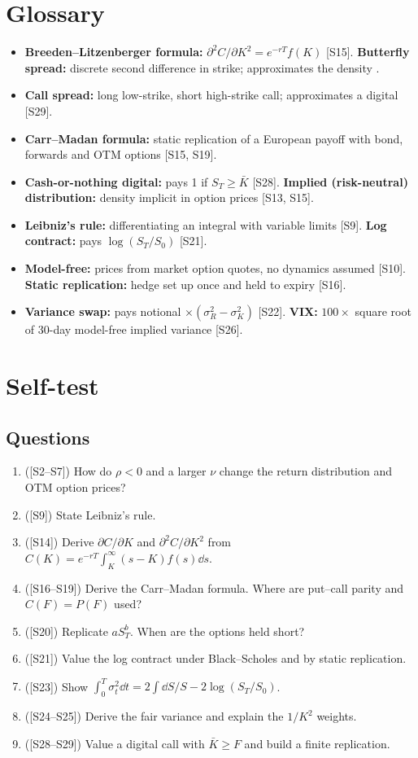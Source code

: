 \documentclass[10pt]{article}
\begin{document}
\section{Glossary}
\begin{itemize}
\item \textbf{Breeden--Litzenberger formula:} $\partial^2C/\partial K^2=e^{-rT}f(K)$ [S15]. \quad \textbf{Butterfly spread:} discrete second difference in strike; approximates the density \beyond.
\item \textbf{Call spread:} long low-strike, short high-strike call; approximates a digital [S29].
\item \textbf{Carr--Madan formula:} static replication of a European payoff with bond, forwards and OTM options [S15, S19].
\item \textbf{Cash-or-nothing digital:} pays 1 if $S_T\ge\bar K$ [S28]. \quad \textbf{Implied (risk-neutral) distribution:} density implicit in option prices [S13, S15].
\item \textbf{Leibniz's rule:} differentiating an integral with variable limits [S9]. \quad \textbf{Log contract:} pays $\log(S_T/S_0)$ [S21].
\item \textbf{Model-free:} prices from market option quotes, no dynamics assumed [S10]. \quad \textbf{Static replication:} hedge set up once and held to expiry [S16].
\item \textbf{Variance swap:} pays notional $\times(\sigma_R^2-\sigma_K^2)$ [S22]. \quad \textbf{VIX:} $100\times$ square root of 30-day model-free implied variance [S26].
\end{itemize}

\section{Self-test}
\subsection*{Questions}
\begin{enumerate}[label=Q\arabic*.]
\item ([S2--S7]) How do $\rho<0$ and a larger $\nu$ change the return distribution and OTM option prices?
\item ([S9]) State Leibniz's rule.
\item ([S14]) Derive $\partial C/\partial K$ and $\partial^2C/\partial K^2$ from $C(K)=e^{-rT}\int_K^\infty(s-K)f(s)\dd s$.
\item ([S16--S19]) Derive the Carr--Madan formula. Where are put--call parity and $C(F)=P(F)$ used?
\item ([S20]) Replicate $aS_T^b$. When are the options held short?
\item ([S21]) Value the log contract under Black--Scholes and by static replication.
\item ([S23]) Show $\int_0^T\sigma_t^2\dd t=2\int\dd S/S-2\log(S_T/S_0)$.
\item ([S24--S25]) Derive the fair variance and explain the $1/K^2$ weights.
\item ([S28--S29]) Value a digital call with $\bar K\ge F$ and build a finite replication.
\end{enumerate}
\end{document}
